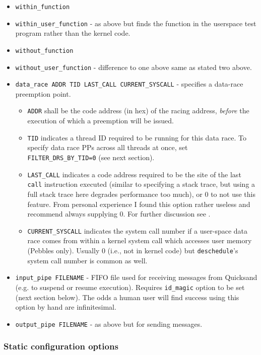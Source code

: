 \begin{itemize}
	\item {\tt within\_function} %
	\item {\tt within\_user\_function} - as above but finds the function in the userspace test program rather than the kernel code.
	\item {\tt without\_function} %
	\item {\tt without\_user\_function} - difference to one above same as stated two above.
	\item {\tt data\_race ADDR TID LAST\_CALL CURRENT\_SYSCALL} - specifies a data-race preemption point.
		\begin{itemize}
			\item {\tt ADDR} shall be the code address (in hex) of the racing address,
			{\em before} the execution of which a preemption will be issued.
			\item {\tt TID} indicates a thread ID required to be running for this data race.
				To specify data race PPs across all threads at once, set {\tt FILTER\_DRS\_BY\_TID=0} (see next section).
			\item {\tt LAST\_CALL} indicates a code address required to be the site of the last {\tt call} instruction executed
				(similar to specifying a stack trace, but using a full stack trace here degrades performance too much),
				or 0 to not use this feature.
				From personal experience I found this option rather useless and recommend always supplying 0.
				For further discussion see \sect{\ref{sec:quicksand-pps}}.
			\item {\tt CURRENT\_SYSCALL} indicates the system call number if a user-space data race comes from within a kernel system call which accesses user memory (Pebbles only).
				Usually 0 (i.e., not in kernel code) but {\tt deschedule}'s system call number is common as well.
		\end{itemize}
	\item {\tt input\_pipe FILENAME} - FIFO file used for receiving messages from Quicksand (e.g. to suspend or resume execution).
		Requires {\tt id\_magic} option to be set (next section below).
		The odds a human user will find success using this option by hand are infinitesimal.
	\item {\tt output\_pipe FILENAME} - as above but for sending messages.
\end{itemize}

\subsubsection{Static configuration options}

